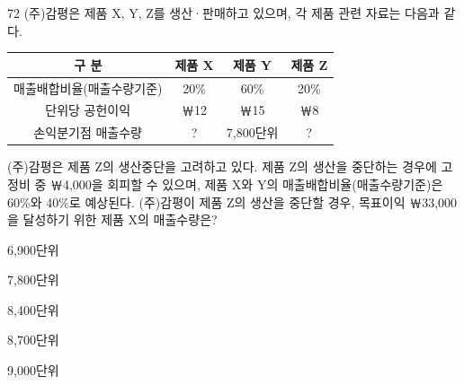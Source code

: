 \begin{question}{72}
(주)감평은 제품 X, Y, Z를 생산·판매하고 있으며, 각 제품 관련 자료는 다음과 같다.
\par{\small\centering\begin{tabular}{|c|c|c|c|}\hline
구 분 & 제품 X & 제품 Y & 제품 Z \\ \hline
매출배합비율(매출수량기준) & 20\% & 60\% & 20\% \\ \hline
단위당 공헌이익 & ￦12 & ￦15 & ￦8 \\ \hline
손익분기점 매출수량 & ? & 7,800단위 & ? \\ \hline
\end{tabular}\par}
(주)감평은 제품 Z의 생산중단을 고려하고 있다. 제품 Z의 생산을 중단하는 경우에 고정비 중 ￦4,000을 회피할 수 있으며, 제품 X와 Y의 매출배합비율(매출수량기준)은 60\%와 40\%로 예상된다. (주)감평이 제품 Z의 생산을 중단할 경우, 목표이익 ￦33,000을 달성하기 위한 제품 X의 매출수량은?
\begin{choices}
  \item 6,900단위
  \item 7,800단위
  \item 8,400단위
  \item 8,700단위
  \item 9,000단위
\end{choices}
\end{question}
